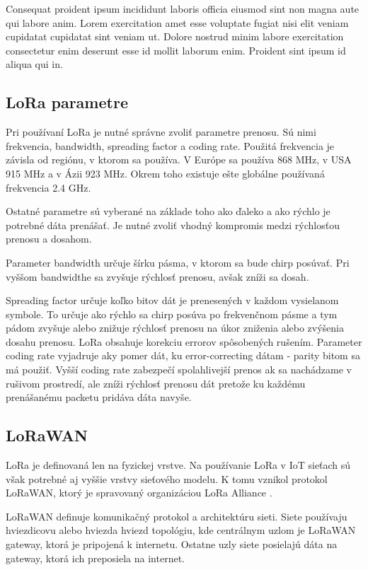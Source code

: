 \documentclass[slovak,master]{diploma}
\begin{document}
Consequat proident ipsum incididunt laboris officia eiusmod sint non magna aute qui labore anim. Lorem exercitation amet esse voluptate fugiat 
nisi elit veniam cupidatat cupidatat sint veniam ut. Dolore nostrud minim labore exercitation consectetur enim deserunt esse id mollit laborum enim. 
Proident sint ipsum id aliqua qui in.


\subsection{LoRa parametre}
Pri používaní LoRa je nutné správne zvoliť parametre prenosu. Sú nimi frekvencia, bandwidth, spreading factor a coding rate.
Použitá frekvencia je závisla od regiónu, v ktorom sa používa. V Európe sa používa 868 MHz, v USA 915 MHz a v Ázii 923 MHz. Okrem toho existuje ešte globálne používaná 
frekvencia 2.4 GHz.

Ostatné parametre sú vyberané na základe toho ako ďaleko a ako rýchlo je potrebné dáta prenášať. Je nutné zvoliť vhodný kompromis medzi rýchlosťou prenosu a dosahom.

Parameter bandwidth určuje šírku pásma, v ktorom sa bude chirp posúvať. Pri vyššom bandwidthe sa zvyšuje rýchlosť prenosu, avšak zníži sa dosah.

Spreading factor určuje koľko bitov dát je prenesených v každom vysielanom symbole. To určuje ako rýchlo sa chirp posúva po frekvenčnom pásme a tym pádom zvyšuje alebo znižuje rýchlosť 
prenosu na úkor zniženia alebo zvýšenia dosahu prenosu.
LoRa obsahuje korekciu errorov spôsobených rušením. Parameter coding rate vyjadruje aky pomer dát, ku error-correcting dátam - parity bitom sa má použiť. Vyšší coding rate zabezpečí spolahlivejší prenos ak 
sa nachádzame v rušivom prostredí, ale zníži rýchlosť prenosu dát pretože ku každému prenášanému packetu pridáva dáta navyše.

\subsection{LoRaWAN}
LoRa je definovaná len na fyzickej vrstve. Na používanie LoRa v IoT sieťach sú však potrebné aj vyššie vrstvy sieťového modelu.
K tomu vznikol protokol LoRaWAN, ktorý je spravovaný organizáciou LoRa Alliance \cite{lora}.

LoRaWAN definuje komunikačný protokol a architektúru sieti. Siete používaju hviezdicovu alebo hviezda hviezd topológiu, kde 
centrálnym uzlom je LoRaWAN gateway, ktorá je pripojená k internetu. Ostatne uzly siete posielajú dáta na gateway, ktorá ich preposiela na internet.
\end{document}
